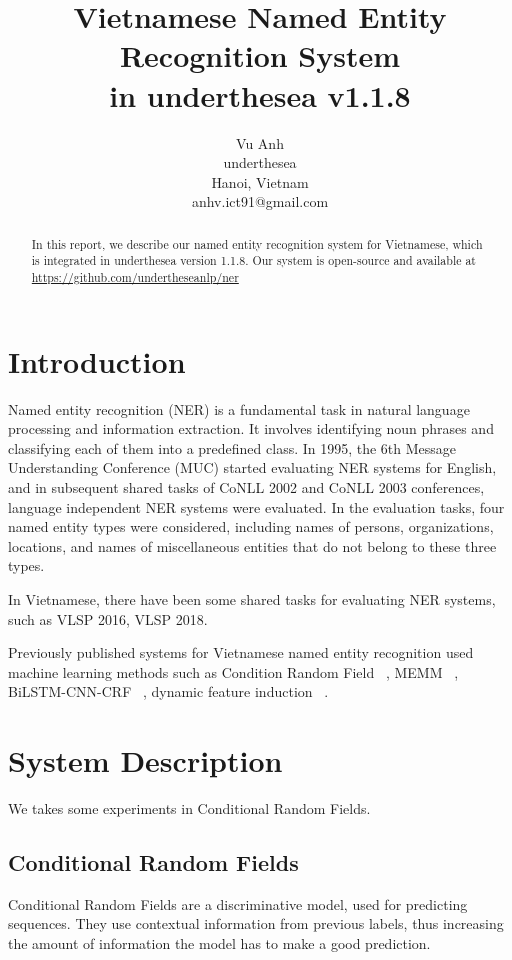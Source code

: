 \documentclass[11pt,a4paper]{article}
\title{Vietnamese Named Entity Recognition System \\ in underthesea v1.1.8}
\author{
Vu Anh\\
underthesea\\
Hanoi, Vietnam\\
anhv.ict91@gmail.com
}
\date{}
\begin{document}
\maketitle
\begin{abstract}
In this report, we describe our named entity recognition system for Vietnamese, which is integrated in underthesea version 1.1.8.
Our system is open-source and available at \url{https://github.com/undertheseanlp/ner}

\end{abstract}

\section{Introduction}

Named entity recognition (NER) is a fundamental task in natural language processing and information extraction.
It involves identifying noun phrases and classifying each of them into a predefined class.
In 1995, the 6th Message Understanding Conference (MUC) started evaluating NER systems for English, and in subsequent shared tasks of CoNLL 2002 and CoNLL 2003 conferences, language independent NER systems were evaluated.
In the evaluation tasks, four named entity types were considered, including names of persons, organizations, locations, and names of miscellaneous entities that do not belong to these three types.

In Vietnamese, there have been some shared tasks for evaluating NER systems, such as VLSP 2016, VLSP 2018.

Previously published systems for Vietnamese named entity recognition used machine learning methods such as Condition Random Field ~\cite{DBLP:journals/corr/abs-1803-08463}, MEMM ~\cite{DBLP:journals/corr/Le-Hong16}, BiLSTM-CNN-CRF ~\cite{DBLP:journals/corr/abs-1708-07241}, dynamic feature induction ~\cite{DBLP:journals/corr/abs-1801-01331}.

\section{System Description}

We takes some experiments in Conditional Random Fields.

\subsection{Conditional Random Fields}

Conditional Random Fields are a discriminative model, used for predicting sequences.
They use contextual information from previous labels, thus increasing the amount of information the model has to make a good prediction.
\end{document}
